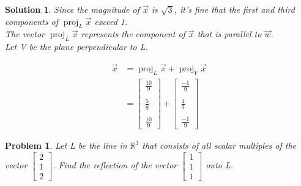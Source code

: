 \documentclass{article}
\newtheorem{problem}{Problem}
\newtheorem*{solution}{Solution}
\DeclareMathOperator{\proj}{proj}
\newcommand{\vectorproj}[2][]{\proj_{#1}#2}
\begin{document}
\begin{solution}
Since the magnitude of $\vec{x}$ is $\sqrt{3}$, it's fine that the first and third components of $\vectorproj[L]{\vec{x}}$ exceed 1. \\

The vector $\vectorproj[L]{\vec{x}}$ represents the component of $\vec{x}$ that is parallel to $\vec{w}$. \\

Let V be the plane perpendicular to L.

\begin{align*}
\vec{x} &= \vectorproj[L]{\vec{x}} + \vectorproj[V]{\vec{x}} \\
&= \begin{bmatrix} \frac{10}{9} \\ \\  \frac{5}{9} \\ \\ \frac{10}{9} \end{bmatrix} + \begin{bmatrix} \frac{-1}{9} \\ \\  \frac{4}{9} \\ \\ \frac{-1}{9} \end{bmatrix}
\end{align*}
\end{solution}

\begin{problem}
Let L be the line in $\mathbb{R}^3$ that consists of all scalar multiples of the vector $\begin{bmatrix} 2 \\ 1 \\ 2 \end{bmatrix}$. Find the reflection of the vector $\begin{bmatrix} 1 \\ 1 \\ 1 \end{bmatrix}$ onto L.
\end{problem}
\end{document}
